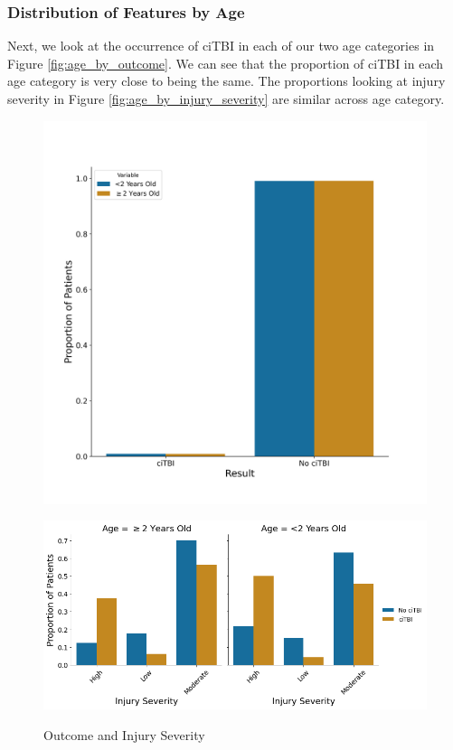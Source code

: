 \documentclass[11pt, letterpaper]{amsart}
\let\Oldsubsubsection\subsubsection
\renewcommand{\subsubsection}{\FloatBarrier\Oldsubsubsection}
\begin{document}
\subsubsection{Distribution of Features by Age}

Next, we look at the occurrence of ciTBI in each of our two age categories in Figure \ref{fig:age_by_outcome}. We can see that the proportion of ciTBI in each age category is very close to being the same. The proportions looking at injury severity in Figure \ref{fig:age_by_injury_severity} are similar across age category.
\begin{figure}
	\begin{minipage}[b]{0.5\linewidth}
		\centering
		\includegraphics[width=\textwidth]{age_comparison_by_group.png}
		\label{fig:age_by_outcome}
	\end{minipage}%
	\begin{minipage}[b]{0.5\linewidth}
		\centering
		\includegraphics[width=\textwidth]{age_by_injuryseverity.png}
		\label{fig:age_by_injury_severity}
	\end{minipage}
	\caption{Outcome and Injury Severity}\label{fig:age_distributions}
\end{figure}
\end{document}
